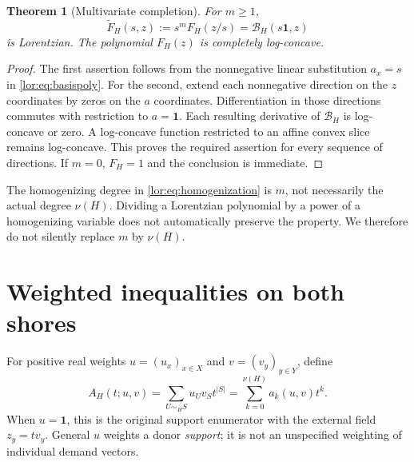 \documentclass[11pt]{article}
\numberwithin{equation}{section}
\newtheorem{theorem}{Theorem}[section]
\theoremstyle{definition}
\begin{document}
\begin{theorem}[Multivariate completion]\label{lor:thm:CLC}
For $m\ge1$,
\begin{equation}
 \widetilde F_H(s,z):=s^mF_H(z/s)
       =\mathcal B_H(s\mathbf1,z)
 \label{lor:eq:homogenization}
\end{equation}
is Lorentzian. The polynomial $F_H(z)$ is completely log-concave.
\end{theorem}
\begin{proof}
The first assertion follows from the nonnegative linear substitution
$a_x=s$ in \eqref{lor:eq:basispoly}. For the second, extend each nonnegative
direction on the $z$ coordinates by zeros on the $a$ coordinates.
Differentiation in those directions commutes with restriction to
$a=\mathbf1$. Each resulting derivative of $\mathcal B_H$ is log-concave
or zero. A log-concave function restricted to an affine convex slice remains
log-concave. This proves the required assertion for every sequence of
directions. If $m=0$, $F_H=1$ and the conclusion is immediate.
\end{proof}
The homogenizing degree in \eqref{lor:eq:homogenization} is $m$, not necessarily
the actual degree $\nu(H)$. Dividing a Lorentzian polynomial by a power of
a homogenizing variable does not automatically preserve the property.
We therefore do not silently replace $m$ by $\nu(H)$.

\section{Weighted inequalities on both shores}
\label{lor:sec:weighted}
For positive real weights $u=(u_x)_{x\in X}$ and $v=(v_y)_{y\in Y}$, define
\begin{equation}
 A_H(t;u,v)=\sum_{U\sim_H S}u_Uv_St^{|S|}
          =\sum_{k=0}^{\nu(H)}a_k(u,v)t^k.
 \label{lor:eq:weighted}
\end{equation}
When $u=\mathbf1$, this is the original support enumerator with the
external field $z_y=t v_y$. General $u$ weights a donor \emph{support}; it
is not an unspecified weighting of individual demand vectors.
\end{document}
